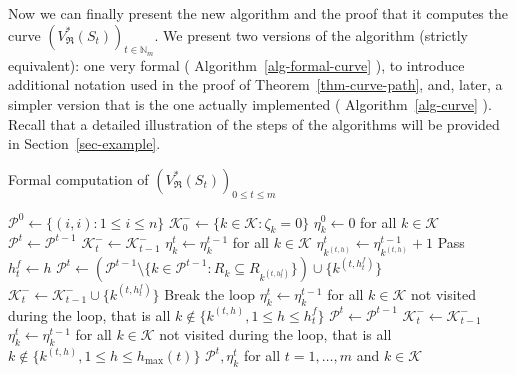 \documentclass[
  11pt,
  a4paper,
]{article}
\theoremstyle{plain}
\theoremstyle{plain}
\theoremstyle{plain}
\theoremstyle{definition}
\theoremstyle{definition}
\theoremstyle{remark}
\begin{document}
Now we can finally present the new algorithm and the proof that it
computes the curve \((V^*_{\mathfrak{R}}(S_t))_{t\in\mathbb{N}_m}\). We
present two versions of the algorithm (strictly equivalent): one very
formal ( Algorithm~\ref{alg-formal-curve} ), to introduce additional
notation used in the proof of Theorem~\ref{thm-curve-path}, and, later,
a simpler version that is the one actually implemented
( Algorithm~\ref{alg-curve} ). Recall that a detailed illustration of
the steps of the algorithms will be provided in
Section~\ref{sec-example}.

\begin{algorithm}[htb!]
\caption{Formal computation of $(V^*_{\mathfrak{R}}(S_t))_{0\leq t\leq m}$}
\label{alg-formal-curve}
\begin{algorithmic}[1]
  \State $\mathcal{P}^0\gets\{(i,i): 1\leq i \leq n\}$ 
  \State $\mathcal{K}^-_0\gets\{k\in\mathcal{K} : \zeta_k=0  \}$
  \State $\eta^0_k\gets0$ for all $k\in\mathcal{K}$
      \State $\mathcal{P}^t \gets \mathcal{P}^{t-1}$
      \State $\mathcal{K}^-_t \gets \mathcal{K}^-_{t-1}$
      \State $\eta^t_k\gets\eta^{t-1}_k$ for all $k\in\mathcal{K}$
    \Else
        \State $\eta^t_{k^{(t,h)}}\gets\eta^{t-1}_{k^{(t,h)}} + 1$
          \State Pass
        \Else
          \State $h^f_t \gets h$ 
          \State $\mathcal{P}^t \gets\left( \mathcal{P}^{t-1}\setminus \{ k\in \mathcal{P}^{t-1} : R_k\subseteq R_{k^{(t,h^f_t)}} \}\right)\cup \{ k^{(t,h^f_t)} \}$
          \State $\mathcal{K}^-_t \gets \mathcal{K}^-_{t-1} \cup \{k^{(t,h^f_t)}\}$
          \State Break the loop
        \EndIf
      \EndFor
        \State $\eta^t_k\gets\eta^{t-1}_k$ for all $k\in\mathcal{K}$ not visited during the loop, that is all $k\not\in\{k^{(t,h)}, 1\leq h\leq h^f_t   \}$
      \Else
        \State $\mathcal{P}^t \gets \mathcal{P}^{t-1}$
        \State $\mathcal{K}^-_t \gets \mathcal{K}^-_{t-1}$
        \State $\eta^t_k\gets\eta^{t-1}_k$ for all $k\in\mathcal{K}$ not visited during the loop, that is all $k\not\in\{k^{(t,h)}, 1\leq h\leq h_{\max}(t)   \}$
      \EndIf
    \EndIf
  \EndFor
  \State\Return $\mathcal{P}^t, \eta^t_k$ for all $t=1,\dotsc, m$ and $k\in\mathcal{K}$
\EndProcedure
\end{algorithmic}
\end{algorithm}
\end{document}
